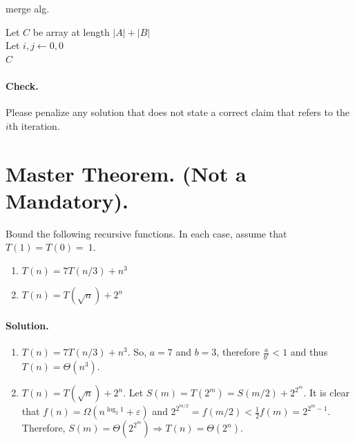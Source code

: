 \begin{algorithm}
\caption{merge alg.} \label{alg:merge}
         Let $C$ be array at length $|A| + |B|$ \\ 
         Let $i, j \leftarrow 0, 0$ \\ 
         \Return $C$  
\end{algorithm}


\ifdefined\CHECK

  \paragraph{Check.} Please penalize any solution that does not state a correct claim that refers to the $i$th iteration.

\fi


\fi

\section{Master Theorem. (Not a Mandatory).}
Bound the following recursive functions. In each case, assume that $T(1)=T(0)=~1$.
\begin{enumerate}
  \item $T(n) = 7T(n/3) + n^{3}$
  \item $T(n) = T(\sqrt{n}) + 2^n$ 
\end{enumerate}

\ifdefined\SOLUTION
  \paragraph{Solution.} 
\begin{enumerate}
 \item $T(n) = 7T(n/3) + n^{3}$. So, $a = 7$ and $b = 3$, therefore $\frac{a}{b^{c}} < 1$ and thus $T(n) = \Theta(n^{3})$.
\item $T(n) = T(\sqrt{n}) + 2^{n}$. Let $S(m) = T(2^{m}) = S(m/2) + 2^{2^{m}}$. It is clear that $f(n) = \Omega(n^{\log_{2}1} + \varepsilon)$ and $2^{2^{m/2}} = f(m/2) < \frac{1}{2}f(m) = 2^{2^{m}-1}$. Therefore, $S(m) = \Theta(2^{2^{m}}) \Rightarrow T(n) = \Theta(2^{n})$.
\end{enumerate}
\fi 

